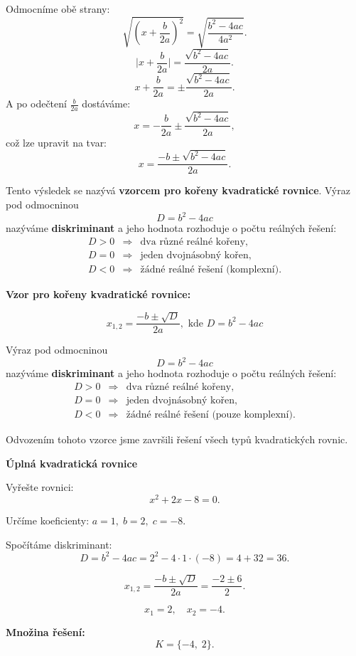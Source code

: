\documentclass[12pt,a4paper]{article}
\begin{document}
Odmocníme obě strany:
\[
\sqrt{\left(x + \frac{b}{2a}\right)^2} = \sqrt{\frac{b^2 - 4ac}{4a^2}}.
\]
\[
\bigg|x + \frac{b}{2a}\bigg| = \frac{\sqrt{b^2 - 4ac}}{2a}.
\]
\[
x + \frac{b}{2a} = \pm \frac{\sqrt{b^2 - 4ac}}{2a}.
\]
A po odečtení \(\tfrac{b}{2a}\) dostáváme:
\[
x  = - \frac{b}{2a} \pm \frac{\sqrt{b^2 - 4ac}}{2a},
\]
což lze upravit na tvar:
\[
x = \frac{-b \pm \sqrt{b^2 - 4ac}}{2a}.
\]



Tento výsledek se nazývá \textbf{vzorcem pro kořeny kvadratické rovnice}.  
Výraz pod odmocninou
\[
D = b^2 - 4ac
\]
nazýváme \textbf{diskriminant} a jeho hodnota rozhoduje o počtu reálných řešení:
\[
\begin{array}{rcl}
D > 0 & \Rightarrow & \text{dva různé reálné kořeny},\\[4pt]
D = 0 & \Rightarrow & \text{jeden dvojnásobný kořen},\\[4pt]
D < 0 & \Rightarrow & \text{žádné reálné řešení (komplexní)}.
\end{array}
\]


\begin{definitionbox}
\textbf{Vzor pro kořeny kvadratické rovnice:}

\medskip
\[
x_{1,2} = \frac{-b \pm \sqrt{D}}{2a},  \text{ kde } D = b^2 - 4ac
\]

\bigskip
Výraz pod odmocninou
\[
D = b^2 - 4ac
\]
nazýváme \textbf{diskriminant} a jeho hodnota rozhoduje o počtu reálných řešení:
\[
\begin{array}{rcl}
D > 0 & \Rightarrow & \text{dva různé reálné kořeny},\\[4pt]
D = 0 & \Rightarrow & \text{jeden dvojnásobný kořen},\\[4pt]
D < 0 & \Rightarrow & \text{žádné reálné řešení (pouze komplexní)}.
\end{array}
\]
\end{definitionbox}


Odvozením tohoto vzorce jsme završili řešení všech typů kvadratických rovnic. 


\begin{examplebox}
\textbf{Úplná kvadratická rovnice}

Vyřešte rovnici:
\[
x^2 + 2x - 8 = 0.
\]

Určíme koeficienty: \(a = 1,\; b = 2,\; c = -8.\)


Spočítáme diskriminant:
\[
D = b^2 - 4ac = 2^2 - 4 \cdot 1 \cdot (-8) = 4 + 32 = 36.
\]

\[
x_{1,2} = \frac{-b \pm \sqrt{D}}{2a} = \frac{-2 \pm 6}{2}.
\]

\[
x_1 = 2, \quad x_2 = -4.
\]

\textbf{Množina řešení:}
\[
K = \{-4,\; 2\}.
\]
\end{examplebox}
\end{document}
